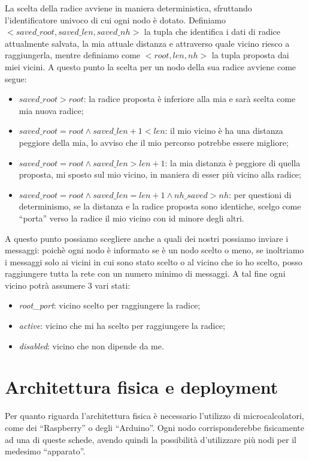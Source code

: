 \documentclass[italian]{memoir}
\begin{document}
La scelta della radice avviene in maniera deterministica, sfruttando l'identificatore univoco di cui ogni nodo è dotato. Definiamo $<saved\_root, saved\_len, saved\_nh>$ la tupla che identifica i dati di radice attualmente salvata, la mia attuale distanza e attraverso quale vicino riesco a raggiungerla, mentre definiamo come $<root, len, nh>$ la tupla proposta dai miei vicini. A questo punto la scelta per un nodo della sua radice avviene come segue:
\begin{itemize}
    \item $saved\_root > root$: la radice proposta è inferiore alla mia e sarà scelta come mia nuova radice;
    \item $saved\_root = root \land saved\_len + 1 < len$: il mio vicino è ha una distanza peggiore della mia, lo avviso che il mio percorso potrebbe essere migliore;
    \item $saved\_root = root \land saved\_len > len + 1 $: la mia distanza è peggiore di quella proposta, mi sposto sul mio vicino, in maniera di esser più vicino alla radice;
    \item $saved\_root = root \land saved\_len = len + 1  \land nh\_saved > nh$: per questioni di determinismo, se la distanza e la radice proposta sono identiche, scelgo come ``porta'' verso la radice il mio vicino con id minore degli altri.
\end{itemize}

A questo punto possiamo scegliere anche a quali dei nostri possiamo inviare i messaggi: poichè ogni nodo è informato se è un nodo scelto o meno, se inoltriamo i messaggi solo ai vicini in cui sono stato scelto o al vicino che io ho scelto, posso raggiungere tutta la rete con un numero minimo di messaggi. A tal fine ogni vicino potrà assumere 3 vari stati:
\begin{itemize}
    \item\textit{root\_port}: vicino scelto per raggiungere la radice;
    \item\textit{active}: vicino che mi ha scelto per raggiungere la radice;
    \item\textit{disabled}: vicino che non dipende da me.
\end{itemize}


\section{Architettura fisica e deployment}
Per quanto riguarda l'architettura fisica è necessario l'utilizzo di microcalcolatori,
	   come dei ``Raspberry'' o degli ``Arduino''. Ogni nodo corrisponderebbe fisicamente
	   ad una di queste schede, avendo quindi la possibilità d'utilizzare più nodi
	   per
	   il medesimo ``apparato''.
\end{document}
